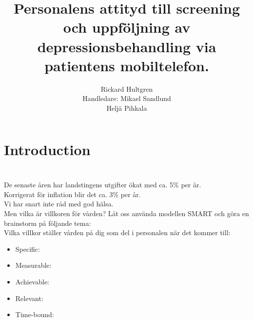 \documentclass[english]{beamer}
\begin{document}
\title[]{Personalens attityd till screening och uppföljning av depressionsbehandling via patientens mobiltelefon.}

\author[Rickard Hultgren]{Rickard Hultgren\\[10mm]{\small Handledare: Mikael Sandlund \\ \hspace{18mm} Heljä Pihkala}}


\begin{frame}
	\titlepage
\end{frame}

\section{Introduction}
\begin{frame}
	\frametitle{}
	\frametitle{}
	\\
	De senaste åren har landstingens utgifter ökat med ca. 5\% per år.\\
	Korrigerat för inflation blir det ca. 3\% per år.\\
	Vi har snart inte råd med god hälsa.\\
	\pause
	\textcolor{lila}{Men vilka är villkoren för vården? Låt oss använda modellen SMART och göra en brainstorm på följande tema:\\Vilka villkor ställer vården på dig som del i personalen när det kommer till:}\\
	\begin{itemize}
		\item \textcolor{lila}{Specific:}
		\item\textcolor{lila}{Measurable:}
		\item\textcolor{lila}{Achievable:}
		\item\textcolor{lila}{Relevant:}
		\item\textcolor{lila}{Time-bound:}
	\end{itemize}
\end{frame}
\end{document}
